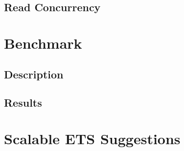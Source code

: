 \documentclass[aps,pre,preprint,nofootinbib]{revtex4}
\begin{document}
\subsection{Read Concurrency}


\section{Benchmark} \label{sec:benchmark}

\subsection{Description}

\subsection{Results}


\section{Scalable ETS Suggestions}

\begin{thebibliography}{9}
\end{thebibliography}
\end{document}
